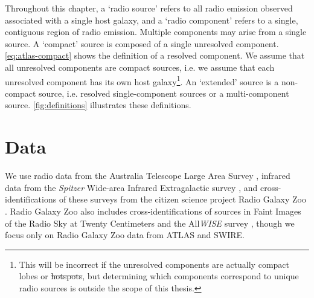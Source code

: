 \documentclass[11pt, a4paper]{book}
\providecommand{\DIFaddtex}[1]{{\protect\color{blue}\uwave{#1}}} %
\providecommand{\DIFdeltex}[1]{{\protect\color{red}\sout{#1}}}                      %
\providecommand{\DIFaddbegin}{} %
\providecommand{\DIFaddend}{} %
\providecommand{\DIFdelbegin}{} %
\providecommand{\DIFdelend}{} %
\providecommand{\DIFadd}[1]{\texorpdfstring{\DIFaddtex{#1}}{#1}} %
\providecommand{\DIFdel}[1]{\texorpdfstring{\DIFdeltex{#1}}{}} %
\newcommand{\DIFscaledelfig}{0.5}
\newlength{\DIFdelgraphicswidth} %
\newlength{\DIFdelgraphicsheight} %
\newcommand{\DIFaddincludegraphics}[2][]{{\color{blue}\fbox{\DIFOincludegraphics[#1]{#2}}}} %
\newcommand{\DIFdelincludegraphics}[2][]{%
\sbox{\DIFdelgraphicsbox}{\DIFOincludegraphics[#1]{#2}}%
\settoboxwidth{\DIFdelgraphicswidth}{\DIFdelgraphicsbox} %
\settoboxtotalheight{\DIFdelgraphicsheight}{\DIFdelgraphicsbox} %
\scalebox{\DIFscaledelfig}{%
\parbox[b]{\DIFdelgraphicswidth}{\usebox{\DIFdelgraphicsbox}\\[-\baselineskip] \rule{\DIFdelgraphicswidth}{0em}}\llap{\resizebox{\DIFdelgraphicswidth}{\DIFdelgraphicsheight}{%
\setlength{\unitlength}{\DIFdelgraphicswidth}%
\begin{picture}(1,1)%
\thicklines\linethickness{2pt} %
{\color[rgb]{1,0,0}\put(0,0){\framebox(1,1){}}}%
{\color[rgb]{1,0,0}\put(0,0){\line( 1,1){1}}}%
{\color[rgb]{1,0,0}\put(0,1){\line(1,-1){1}}}%
\end{picture}%
}\hspace*{3pt}}} %
} %
\DeclareRobustCommand{\DIFaddbegin}{\DIFOaddbegin \let\includegraphics\DIFaddincludegraphics} %
\DeclareRobustCommand{\DIFaddend}{\DIFOaddend \let\includegraphics\DIFOincludegraphics} %
\DeclareRobustCommand{\DIFdelbegin}{\DIFOdelbegin \let\includegraphics\DIFdelincludegraphics} %
\DeclareRobustCommand{\DIFdelend}{\DIFOaddend \let\includegraphics\DIFOincludegraphics} %
\begin{document}
    {Throughout this chapter, a `radio source' refers to all radio emission observed associated with a single host galaxy, and a `radio component' refers to a single, contiguous
    region of radio emission. Multiple components may arise from a single
    source. A `compact' source is composed of a {single unresolved component. \autoref{eq:atlas-compact} shows the definition of a resolved component. We
    assume that all unresolved components are compact sources, i.e. we assume that each unresolved component has its own host galaxy\footnote{{This will be incorrect if the unresolved components are actually compact lobes or \DIFdelbegin \DIFdel{hotspots}\DIFdelend \DIFaddbegin \DIFadd{hot-spots}\DIFaddend , but determining which components correspond to unique radio sources is outside the scope of this thesis.}}.} An `extended'
    source is a non-compact source, i.e. resolved single-component sources or a
    multi-component source. \autoref{fig:definitions} illustrates these definitions.}

\section{Data}\label{sec:atlas-xid-data}

  We use radio data from the Australia Telescope Large Area Survey
  \citep[ATLAS;][]{norris06,franzen15}, infrared data from the \emph{Spitzer}
  Wide-area Infrared Extragalactic survey \citep[SWIRE;][]{lonsdale03swire,
  surace05swire}, and cross-identifications of these surveys from the citizen
  science project Radio Galaxy Zoo \citep{banfield15}. Radio Galaxy Zoo also
  includes cross-identifications of sources in Faint Images of the Radio Sky at
  Twenty Centimeters \citep[FIRST;][]{white97first} and the All\emph{WISE}
  survey \citep{cutri2013wiseexplanatory}, though we focus only on Radio
  Galaxy Zoo data from ATLAS and SWIRE.
\end{document}
